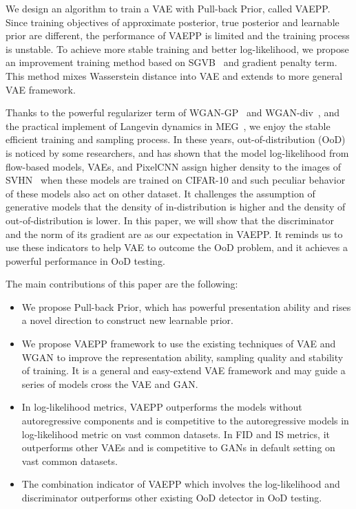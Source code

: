 We design an algorithm to train a VAE with Pull-back Prior, called VAEPP. Since training objectives of approximate posterior, true posterior and learnable prior are different, the performance of VAEPP is limited and the training process is unstable. To achieve more stable training and better log-likelihood, we propose an improvement training method based on SGVB~\cite{kingma2014auto} and gradient penalty term. This method mixes Wasserstein distance into VAE and extends to more general VAE framework. 

Thanks to the powerful regularizer term of WGAN-GP~\cite{gulrajani2017improved} and WGAN-div~\cite{wu2018wasserstein}, and the practical implement of Langevin dynamics in MEG~\cite{kumar2019maximum}, we enjoy the stable efficient training and sampling process. In these years, out-of-distribution (OoD) is noticed by some researchers, and \cite{nalisnick2018deep} has shown that the model log-likelihood from flow-based models, VAEs, and PixelCNN assign higher density to the images of SVHN~\cite{netzer2011reading} when these models are trained on CIFAR-10 and such peculiar behavior of these models also act on other dataset. It challenges the assumption of generative models that the density of in-distribution is higher and the density of out-of-distribution is lower. In this paper, we will show that the discriminator and the norm of its gradient are as our expectation in VAEPP. It reminds us to use these indicators to help VAE to outcome the OoD problem, and it achieves a powerful performance in OoD testing.

The main contributions of this paper are the following:
\begin{itemize}
	\item We propose Pull-back Prior, which has powerful presentation ability and rises a novel direction to construct new learnable prior. 
	\item We propose VAEPP framework to use the existing techniques of VAE and WGAN to improve the representation ability, sampling quality and stability of training. It is a general and easy-extend VAE framework and may guide a series of models cross the VAE and GAN. 
	\item In log-likelihood metrics, VAEPP outperforms the models without autoregressive components and is competitive to the autoregressive models in log-likelihood metric on vast common datasets. In FID and IS metrics, it outperforms other VAEs and is competitive to GANs in default setting on vast common datasets. 
	\item The combination indicator of VAEPP which involves the log-likelihood and discriminator outperforms other existing OoD detector in OoD testing.
\end{itemize}
